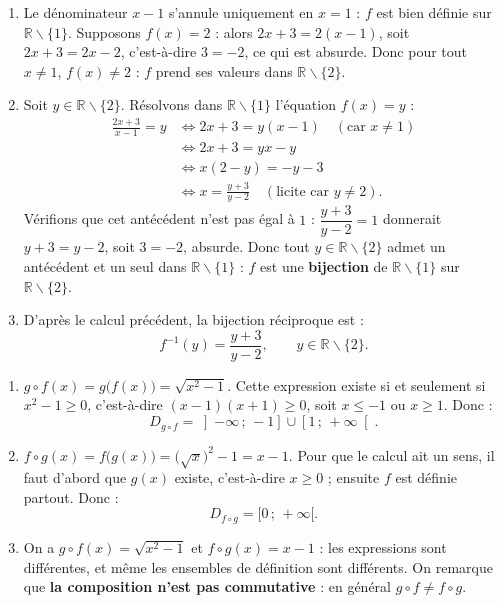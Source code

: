\documentclass[11pt]{article}
\def\setminus{\mathbin{\backslash}}\let\smallsetminus\setminus
\begin{document}
\begin{corrige}
\begin{enumerate}
\item Le dénominateur $x-1$ s'annule uniquement en $x=1$ : $f$ est bien définie sur $\mathbb{R}\setminus\{1\}$. Supposons $f(x)=2$ : alors $2x+3=2(x-1)$, soit $2x+3=2x-2$, c'est-à-dire $3=-2$, ce qui est absurde. Donc pour tout $x\neq 1$, $f(x)\neq 2$ : $f$ prend ses valeurs dans $\mathbb{R}\setminus\{2\}$.
\item Soit $y\in\mathbb{R}\setminus\{2\}$. Résolvons dans $\mathbb{R}\setminus\{1\}$ l'équation $f(x)=y$ :
\begin{align*}
\frac{2x+3}{x-1}=y &\iff 2x+3=y(x-1) \quad (\text{car } x\neq 1)\\
&\iff 2x+3=yx-y\\
&\iff x(2-y)=-y-3\\
&\iff x=\frac{y+3}{y-2} \quad (\text{licite car } y\neq 2).
\end{align*}
Vérifions que cet antécédent n'est pas égal à $1$ : $\dfrac{y+3}{y-2}=1$ donnerait $y+3=y-2$, soit $3=-2$, absurde. Donc tout $y\in\mathbb{R}\setminus\{2\}$ admet un antécédent et un seul dans $\mathbb{R}\setminus\{1\}$ : $f$ est une \textbf{bijection} de $\mathbb{R}\setminus\{1\}$ sur $\mathbb{R}\setminus\{2\}$.
\item D'après le calcul précédent, la bijection réciproque est :
\[ f^{-1}(y)=\frac{y+3}{y-2},\qquad y\in\mathbb{R}\setminus\{2\}. \]
\end{enumerate}
\end{corrige}

\begin{corrige}
\begin{enumerate}
\item $g\circ f(x)=g\bigl(f(x)\bigr)=\sqrt{x^2-1}$. Cette expression existe si et seulement si $x^2-1\geq 0$, c'est-à-dire $(x-1)(x+1)\geq 0$, soit $x\leq -1$ ou $x\geq 1$. Donc :
\[ D_{g\circ f}=\left]-\infty\,;\,-1\right]\cup\left[1\,;\,+\infty\right[. \]
\item $f\circ g(x)=f\bigl(g(x)\bigr)=\bigl(\sqrt{x}\bigr)^2-1=x-1$. Pour que le calcul ait un sens, il faut d'abord que $g(x)$ existe, c'est-à-dire $x\geq 0$ ; ensuite $f$ est définie partout. Donc :
\[ D_{f\circ g}=[0\,;\,+\infty[. \]
\item On a $g\circ f(x)=\sqrt{x^2-1}$ et $f\circ g(x)=x-1$ : les expressions sont différentes, et même les ensembles de définition sont différents. On remarque que \textbf{la composition n'est pas commutative} : en général $g\circ f\neq f\circ g$.
\end{enumerate}
\end{corrige}
\end{document}

